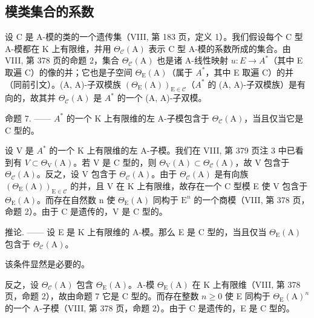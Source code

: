 \subsection{模类集合的系数}

设 C 是 A-模的类的一个遗传集（VIII, 第 183 页，定义 1）。我们假设每个 C 型 A-模都在 K 上有限维，并用 \(\Theta_{\mathcal{C}}(\mathrm{A})\) 表示 C 型 A-模的系数所成的集合。由 VIII, 第 378 页的命题 2，集合 \(\Theta_{\mathcal{C}}(\mathrm{A})\) 也是诸 A-线性映射 \(u: E \to A^{*}\)（其中 E 取遍 C）的像的并；它也是子空间 \(\Theta_{\mathrm{E}}(\mathrm{A})\)（属于 \(A^{*}\)，其中 E 取遍 C）的并（同前引文）。(A, A)-子双模族 \((\Theta_{\mathrm{E}}(\mathrm{A}))_{\mathrm{E} \in \mathcal{C}}\)（\(A^{*}\) 的 (A, A)-子双模族）是有向的，故其并 \(\Theta_{\mathcal{C}}(\mathrm{A})\) 是 \(A^{*}\) 的一个 (A, A)-子双模。

命题 7. —— \(A^{*}\) 的一个 K 上有限维的左 A-子模包含于 \(\Theta_{\mathcal{C}}(\mathrm{A})\)，当且仅当它是 C 型的。

设 V 是 \(A^{*}\) 的一个 K 上有限维的左 A-子模。我们在 VIII, 第 379 页注 3 中已看到有 \(V \subset \Theta_{\mathrm{V}}(\mathrm{A})\)。若 V 是 C 型的，则 \(\Theta_{\mathrm{V}}(\mathrm{A}) \subset \Theta_{\mathcal{C}}(\mathrm{A})\)，故 V 包含于 \(\Theta_{\mathcal{C}}(\mathrm{A})\)。反之，设 V 包含于 \(\Theta_{\mathcal{C}}(\mathrm{A})\)。由于 \(\Theta_{\mathcal{C}}(\mathrm{A})\) 是有向族 \((\Theta_{\mathrm{E}}(\mathrm{A}))_{\mathrm{E}\in\mathcal{C}}\) 的并，且 V 在 K 上有限维，故存在一个 C 型模 E 使 V 包含于 \(\Theta_{\mathrm{E}}(\mathrm{A})\)。而存在自然数 n 使 \(\Theta_{\mathrm{E}}(\mathrm{A})\) 同构于 \(\mathrm{E}^{n}\) 的一个商模（VIII, 第 378 页，命题 2）。由于 C 是遗传的，V 是 C 型的。

推论. —— 设 E 是 K 上有限维的 A-模。那么 E 是 C 型的，当且仅当 \(\Theta_{\mathrm{E}}(\mathrm{A})\) 包含于 \(\Theta_{\mathcal{C}}(\mathrm{A})\)。

该条件显然是必要的。

反之，设 \(\Theta_{\mathcal{C}}(\mathrm{A})\) 包含 \(\Theta_{\mathrm{E}}(\mathrm{A})\)。A-模 \(\Theta_{\mathrm{E}}(\mathrm{A})\) 在 K 上有限维（VIII, 第 378 页，命题 2），故由命题 7 它是 C 型的。而存在整数 \(n \geqslant 0\) 使 E 同构于 \(\Theta_{\mathrm{E}}(\mathrm{A})^{n}\) 的一个 A-子模（VIII, 第 378 页，命题 2）。由于 C 是遗传的，E 是 C 型的。


